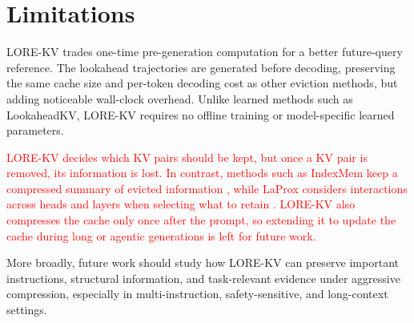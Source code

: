 \documentclass{article} %
\begin{document}
\section{Limitations} \label{app:limitations}
LORE-KV trades one-time pre-generation computation for a better future-query reference. The lookahead trajectories are generated before decoding, preserving the same cache size and per-token decoding cost as other eviction methods, but adding noticeable wall-clock overhead. Unlike learned methods such as LookaheadKV, LORE-KV requires no offline training or model-specific learned parameters.

\textcolor{red}{LORE-KV decides which KV pairs should be kept, but once a KV pair is removed, its information is lost. In contrast, methods such as IndexMem keep a compressed summary of evicted information \citep{yang2026indexmem}, while LaProx considers interactions across heads and layers when selecting what to retain \citep{mai2026laprox}. LORE-KV also compresses the cache only once after the prompt, so extending it to update the cache during long or agentic generations is left for future work.}

More broadly, future work should study how LORE-KV can preserve important instructions, structural information, and task-relevant evidence under aggressive compression, especially in multi-instruction, safety-sensitive, and long-context settings.
\end{document}
